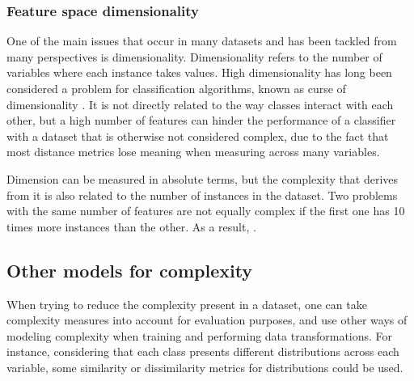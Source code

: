 \subsubsection{Feature space dimensionality}

One of the main issues that occur in many datasets and has been tackled from many perspectives is dimensionality. Dimensionality refers to the number of variables where each instance takes values. High dimensionality has long been considered a problem for classification algorithms, known as curse of dimensionality \cite{aggarwal2001surprising}. It is not directly related to the way classes interact with each other, but a high number of features can hinder the performance of a classifier with a dataset that is otherwise not considered complex, due to the fact that most distance metrics lose meaning when measuring across many variables.

Dimension can be measured in absolute terms, but the complexity that derives from it is also related to the number of instances in the dataset. Two problems with the same number of features are not equally complex if the first one has 10 times more instances than the other. As a result, .




\subsection{Other models for complexity}

When trying to reduce the complexity present in a dataset, one can take complexity measures into account for evaluation purposes, and use other ways of modeling complexity when training and performing data transformations. For instance, considering that each class presents different distributions across each variable, some similarity or dissimilarity metrics for distributions could be used.

